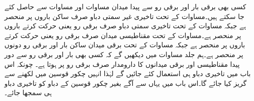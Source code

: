 کسی بھی برقی بار اور برقی رو سے پیدا میدان مساوات  اور مساوات  سے حاصل کئے جا سکتے ہیں۔مساوات  کے تحت تاخیری غیر سمتی دباو  صرف ساکن باروں پر منحصر ہے جبکہ مساوات  کے تحت  تاخیری سمتی دباو  صرف برقی رو یعنی حرکت کرتے باروں پر منحصر ہے۔مساوات  کے تحت مقناطیسی میدان  صرف برقی رو یعنی حرکت کرتے باروں پر منحصر ہے جبکہ مساوات  کے تحت برقی میدان  ساکن بار اور برقی رو دونوں پر منحصر ہے۔ہم جلد مساوات  میں دیکھیں گے کہ کسی بھی بار اور برقی رو سے  دور پیدا مقناطیسی اور برقی میدانوں کا دارومدار صرف برقی رو پر ہوتا ہے۔ چونکہ اس باب میں تاخیری دباو ہی استعمال کئے جائیں گے لہٰذا انہیں چکور قوسین میں لکھنے سے گریز کیا جائے گا۔اس باب میں یہاں سے آگے بغیر چکور قوسین کے دباو کو تاخیری دباو ہی سمجھا جائے۔

